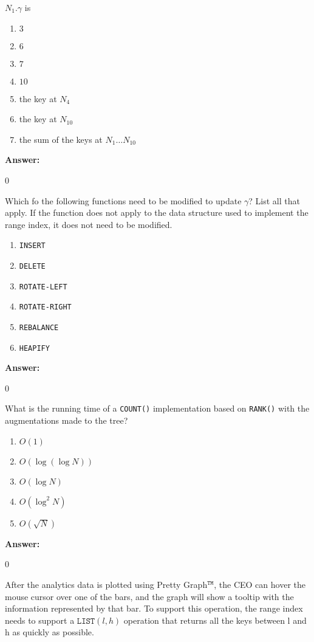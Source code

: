 \documentclass[12pt,twoside]{article}
\newcommand{\answer}{
 \par\medskip
 \textbf{Answer:}
}
\newcommand{\answerIn}{ \answer
0
}
\newcommand{\answerIo}{ \answer
0
}
\newcommand{\answerIp}{ \answer
0
}
\begin{document}
\begin{problems}
\begin{problemparts}
  \problempart {} $N_1.\gamma$ is
    \begin{enumerate}
      \item $3$
      \item $6$
      \item $7$
      \item $10$
      \item the key at $N_4$
      \item the key at $N_{10}$
      \item the sum of the keys at $N_1\dots N_{10}$
    \end{enumerate}
\answerIn

  \problempart {} Which fo the following functions need to be modified
  to update $\gamma$? List all that apply. If the function does not apply to
  the data structure used to implement the range index, it does not need to be
  modified.
    \begin{enumerate}
      \item \texttt{INSERT}
      \item \texttt{DELETE}
      \item \texttt{ROTATE-LEFT}
      \item \texttt{ROTATE-RIGHT}
      \item \texttt{REBALANCE}
      \item \texttt{HEAPIFY}
    \end{enumerate}
\answerIo

  \problempart {} What is the running time of a \texttt{COUNT()}
  implementation based on \texttt{RANK()} with the augmentations made to the
  tree?
    \begin{enumerate}
      \item $O(1)$
      \item $O(\log(\log N))$
      \item $O(\log N)$
      \item $O(\log^2 N)$
      \item $O(\sqrt{N})$
    \end{enumerate}
\answerIp

\end{problemparts}

After the analytics data is plotted using Pretty Graph$^{\texttt{TM}}$, the CEO can
hover the mouse cursor over one of the bars, and the graph will show a tooltip with
the information represented by that bar. To support this operation, the range index
needs to support a $\texttt{LIST}(l, h)$ operation that returns all the keys between
l and h as quickly as possible.


\end{problems}
\end{document}
